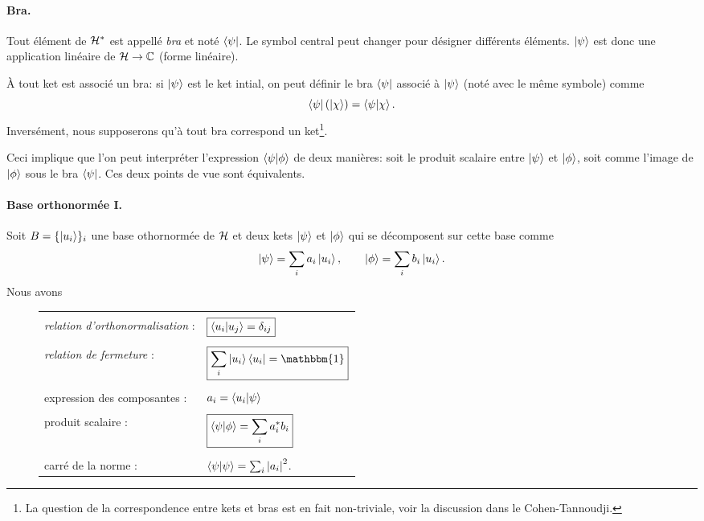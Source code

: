 \documentclass[11pt,a4paper,oneside]{article}
\begin{document}
\paragraph{Bra.} Tout élément de $\mathcal{H}^*$ est appellé \emph{bra} et noté $\bra{\psi}$. Le symbol central peut changer pour désigner différents éléments. $\ket{\psi}$ est donc une application linéaire de $\mathcal{H}\to\mathbb{C}$ (forme linéaire).  

À tout ket est associé un bra: si $\ket{\psi_{}}$ est le ket intial, on peut définir le bra $\bra{\psi}$ associé à $\ket{\psi_{}}$ (noté avec le même symbole) comme
\begin{equation}
    \bra{\psi}(\ket{\chi})=\braket{\psi}{\chi}.
\end{equation}
Inversément, nous supposerons qu'à tout bra correspond un ket\footnote{La question de la correspondence entre kets et bras est en fait non-triviale, voir la discussion dans le Cohen-Tannoudji.}.

Ceci implique que l'on peut interpréter l'expression $\braket{\psi}{\phi}$ de deux manières: soit le produit scalaire entre $\ket{\psi_{}}$ et $\ket{\phi}$, soit comme l'image de $\ket{\phi}$ sous le bra $\bra{\psi}$. Ces deux points de vue sont équivalents.

\paragraph{Base orthonormée I.} Soit $B=\{\ket{u_i}\}_i$ une base othornormée de $\mathcal{H}$ et deux kets $\ket{\psi_{}}$ et $\ket{\phi}$ qui se décomposent sur cette base comme
\begin{equation}
    \ket{\psi_{}} = \sum_i a_i\ket{u_i},\qquad \ket{\phi} = \sum_i b_i\ket{u_i}.
\end{equation}
\newpage
Nous avons
\begin{figure}[H]
    \centering
    \begin{tabular}{ll}
         & \\
        \emph{relation d'orthonormalisation} : &  $\boxed{\braket{u_i}{u_j}=\delta_{ij}}$ \\
        & \\
        \emph{relation de fermeture} : & $\boxed{\sum_i\ket{u_i}\bra{u_i}=\mathbbm{1}}$ \\
        & \\
        expression des composantes : & $a_i=\braket{u_i}{\psi}$ \\
        & \\
        produit scalaire : & $\boxed{\braket{\psi}{\phi}=\sum_i a^*_ib_i}$ \\
        & \\
        carré de la norme : & $\braket{\psi}=\sum_i\abs{a_i}^2$.
    \end{tabular}
\end{figure}
\end{document}

